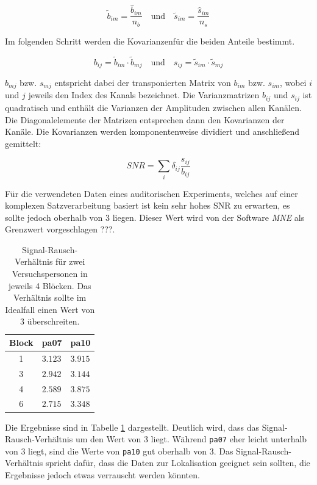 \documentclass[doc,a4paper,12pt]{apa6}
\begin{document}
\begin{equation}
\tilde{b}_{im} = \frac{\hat{b}_{im}}{n_b} \quad \text{und} \quad \tilde{s}_{im} = \frac{\hat{s}_{im}}{n_s}
\end{equation}

Im folgenden Schritt werden die Kovarianzenfür die beiden Anteile bestimmt.

\begin{equation}
b_{ij} = \tilde{b}_{im} \cdot \tilde{b}_{mj} \quad \text{und} \quad s_{ij} = \tilde{s}_{im} \cdot \tilde{s}_{mj}
\end{equation}

$b_{mj}$ bzw. $s_{mj}$ entspricht dabei der transponierten Matrix von $b_{im}$ bzw. $s_{im}$, wobei $i$ und $j$ jeweils den Index des Kanals bezeichnet. Die Varianzmatrizen $b_{ij}$ und $s_{ij}$ ist quadratisch und enthält die Varianzen der Amplituden zwischen allen Kanälen. Die Diagonalelemente der Matrizen entsprechen dann den Kovarianzen der Kanäle. Die Kovarianzen werden komponentenweise dividiert und anschließend gemittelt:

\begin{equation}
SNR = \sum_i \delta_{ij} \frac{s_{ij}}{b_{ij}}
\end{equation}

Für die verwendeten Daten eines auditorischen Experiments, welches auf einer komplexen Satzverarbeitung basiert ist kein sehr hohes SNR zu erwarten, es sollte jedoch oberhalb von $3$ liegen. Dieser Wert wird von der Software \emph{MNE} als Grenzwert vorgeschlagen ???.

\begin{table}[t]
\caption{}
\label{tab:snr}
\vspace*{3mm}
\begin{tabularx}{\textwidth}{cll}
Block & pa07 & pa10 \\
\hline
1 & $3.123$ & $3.915$\\
3 & $2.942$ & $3.144$\\
4 & $2.589$ & $3.875$\\
6 & $2.715$ & $3.348$\\
\hline
\end{tabularx}
\vspace*{3mm}
\caption*{Signal-Rausch-Verhältnis für zwei Versuchspersonen in jeweils 4 Blöcken. Das Verhältnis sollte im Idealfall einen Wert von $3$ überschreiten.}
\end{table}

Die Ergebnisse sind in Tabelle \ref{tab:snr} dargestellt. Deutlich wird, dass das Signal-Rausch-Verhältnis um den Wert von $3$ liegt. Während \texttt{pa07} eher leicht unterhalb von $3$ liegt, sind die Werte von \texttt{pa10} gut oberhalb von $3$. Das Signal-Rausch-Verhältnis spricht dafür, dass die Daten zur Lokalisation geeignet sein sollten, die Ergebnisse jedoch etwas verrauscht werden könnten.
\end{document}

